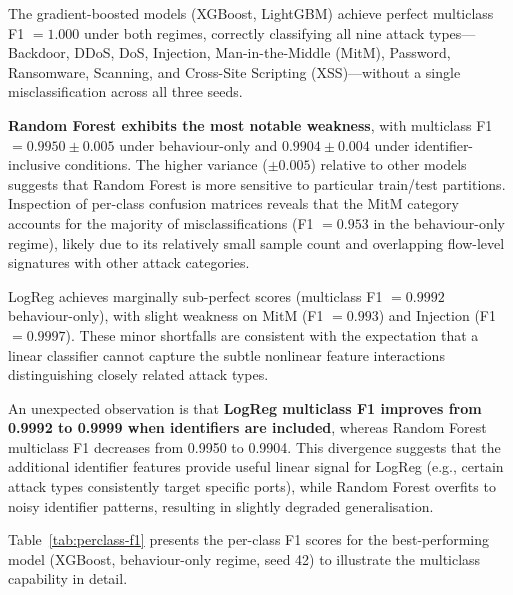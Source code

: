 \documentclass[12pt,a4paper]{report}
\begin{document}
The gradient-boosted models (XGBoost, LightGBM) achieve perfect multiclass F1 $= 1.000$ under both regimes, correctly classifying all nine attack types---Backdoor, DDoS, DoS, Injection, Man-in-the-Middle (MitM), Password, Ransomware, Scanning, and Cross-Site Scripting (XSS)---without a single misclassification across all three seeds.

\textbf{Random Forest exhibits the most notable weakness}, with multiclass F1 $= 0.9950 \pm 0.005$ under behaviour-only and $0.9904 \pm 0.004$ under identifier-inclusive conditions. The higher variance ($\pm 0.005$) relative to other models suggests that Random Forest is more sensitive to particular train/test partitions. Inspection of per-class confusion matrices reveals that the MitM category accounts for the majority of misclassifications (F1 $= 0.953$ in the behaviour-only regime), likely due to its relatively small sample count and overlapping flow-level signatures with other attack categories.

LogReg achieves marginally sub-perfect scores (multiclass F1 $= 0.9992$ behaviour-only), with slight weakness on MitM (F1 $= 0.993$) and Injection (F1 $= 0.9997$). These minor shortfalls are consistent with the expectation that a linear classifier cannot capture the subtle nonlinear feature interactions distinguishing closely related attack types.

An unexpected observation is that \textbf{LogReg multiclass F1 improves from 0.9992 to 0.9999 when identifiers are included}, whereas Random Forest multiclass F1 decreases from 0.9950 to 0.9904. This divergence suggests that the additional identifier features provide useful linear signal for LogReg (e.g., certain attack types consistently target specific ports), while Random Forest overfits to noisy identifier patterns, resulting in slightly degraded generalisation.

Table~\ref{tab:perclass-f1} presents the per-class F1 scores for the best-performing model (XGBoost, behaviour-only regime, seed 42) to illustrate the multiclass capability in detail.
\end{document}
